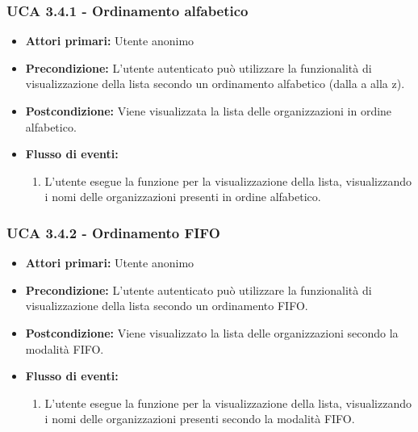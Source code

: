 \subsubsection{UCA 3.4.1 - Ordinamento alfabetico}%
\begin{itemize}
	\item \textbf{Attori primari:} Utente anonimo
	\item \textbf{Precondizione:} L'utente autenticato può utilizzare la funzionalità di visualizzazione della lista secondo un ordinamento alfabetico (dalla a alla z).
	\item \textbf{Postcondizione:} Viene visualizzata la lista delle organizzazioni in ordine alfabetico.
	\item \textbf{Flusso di eventi:}
	\begin{enumerate}
		\item L'utente esegue la funzione per la visualizzazione della lista, visualizzando i nomi delle organizzazioni presenti in ordine alfabetico.
	\end{enumerate}
\end{itemize}

\subsubsection{UCA 3.4.2 - Ordinamento FIFO}%
\begin{itemize}	
	\item \textbf{Attori primari:} Utente anonimo
	\item \textbf{Precondizione:} L'utente autenticato può utilizzare la funzionalità di visualizzazione della lista secondo un ordinamento FIFO.
	\item \textbf{Postcondizione:} Viene visualizzato la lista delle organizzazioni secondo la modalità FIFO.
	\item \textbf{Flusso di eventi:}
		\begin{enumerate}
		\item L'utente esegue la funzione per la visualizzazione della lista, visualizzando i nomi delle organizzazioni presenti secondo la modalità FIFO.
	\end{enumerate}
\end{itemize}

